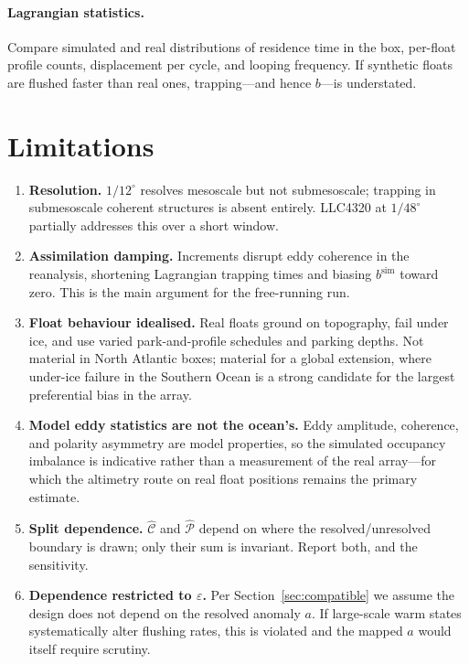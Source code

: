 \documentclass[11pt]{article}
\begin{document}
\paragraph{Lagrangian statistics.} Compare simulated and real distributions of residence time in
the box, per-float profile counts, displacement per cycle, and looping frequency. If synthetic
floats are flushed faster than real ones, trapping---and hence $b$---is understated.

\section{Limitations}

\begin{enumerate}[leftmargin=*]
  \item \textbf{Resolution.} $1/12^\circ$ resolves mesoscale but not submesoscale; trapping in
        submesoscale coherent structures is absent entirely. LLC4320 at $1/48^\circ$ partially
        addresses this over a short window.
  \item \textbf{Assimilation damping.} Increments disrupt eddy coherence in the reanalysis,
        shortening Lagrangian trapping times and biasing $b^{\text{sim}}$ toward zero. This is
        the main argument for the free-running run.
  \item \textbf{Float behaviour idealised.} Real floats ground on topography, fail under ice,
        and use varied park-and-profile schedules and parking depths. Not material in North
        Atlantic boxes; material for a global extension, where under-ice failure in the Southern
        Ocean is a strong candidate for the largest preferential bias in the array.
  \item \textbf{Model eddy statistics are not the ocean's.} Eddy amplitude, coherence, and
        polarity asymmetry are model properties, so the simulated occupancy imbalance is
        indicative rather than a measurement of the real array---for which the altimetry route on
        real float positions remains the primary estimate.
  \item \textbf{Split dependence.} $\widehat{\mathcal{C}}$ and $\widehat{\mathcal{P}}$ depend on
        where the resolved/unresolved boundary is drawn; only their sum is invariant. Report
        both, and the sensitivity.
  \item \textbf{Dependence restricted to $\varepsilon$.} Per Section~\ref{sec:compatible} we
        assume the design does not depend on the resolved anomaly $a$. If large-scale warm states
        systematically alter flushing rates, this is violated and the mapped $a$ would itself
        require scrutiny.
\end{enumerate}
\end{document}
